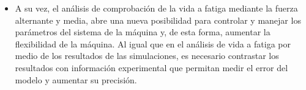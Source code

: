 \begin{itemize}
	\item A su vez, el análisis de comprobación de la vida a fatiga mediante la fuerza alternante y media, abre una nueva posibilidad para controlar y manejar los parámetros del sistema de la máquina y, de esta forma, aumentar la flexibilidad de la máquina. Al igual que en el análisis de vida a fatiga por medio de los resultados de las simulaciones, es necesario contrastar los resultados con información experimental que permitan medir el error del modelo y aumentar su precisión.
\end{itemize}

%

\newpage

